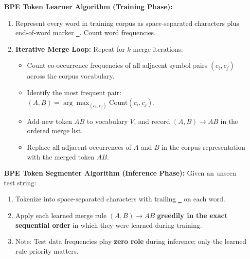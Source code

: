 \documentclass[10pt,a4paper]{article}
\newcommand{\rx}[1]{\texttt{\bfseries\color{inlinecode}#1}}
\begin{document}
\vspace{-2pt}
\begin{insightbox}[title={\bfseries\sffamily Formal Algorithmic Specification: BPE Learner \& Segmenter}]
\footnotesize
\textbf{BPE Token Learner Algorithm (Training Phase):}
\begin{enumerate}[leftmargin=14pt, itemsep=0.5pt, parsep=0pt, topsep=0.5pt]
    \item Represent every word in training corpus as space-separated characters plus end-of-word marker \rx{\_}. Count word frequencies.
    \item \textbf{Iterative Merge Loop:} Repeat for $k$ merge iterations:
    \begin{itemize}[leftmargin=10pt, itemsep=0.5pt]
        \item Count co-occurrence frequencies of all adjacent symbol pairs $(c_i, c_j)$ across the corpus vocabulary.
        \item Identify the most frequent pair: $(A, B) = \arg\max_{(c_i, c_j)} \text{Count}(c_i, c_j)$.
        \item Add new token $AB$ to vocabulary $V$, and record $(A, B) \rightarrow AB$ in the ordered merge list.
        \item Replace all adjacent occurrences of $A$ and $B$ in the corpus representation with the merged token $AB$.
    \end{itemize}
\end{enumerate}
\textbf{BPE Token Segmenter Algorithm (Inference Phase):}
Given an unseen test string:
\begin{enumerate}[leftmargin=14pt, itemsep=0.5pt, parsep=0pt, topsep=0.5pt]
    \item Tokenize into space-separated characters with trailing \rx{\_} on each word.
    \item Apply each learned merge rule $(A, B) \rightarrow AB$ \textbf{greedily in the exact sequential order} in which they were learned during training.
    \item Note: Test data frequencies play \textbf{zero role} during inference; only the learned rule priority matters.
\end{enumerate}
\end{insightbox}
\end{document}
